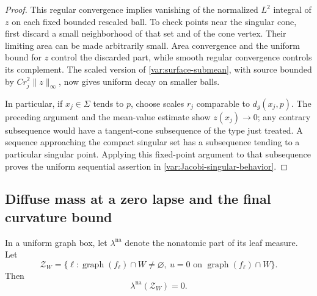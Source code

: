 \begin{proof}
This regular convergence implies vanishing of the normalized
$L^2$ integral of $z$ on each fixed bounded rescaled ball.
To check points near the singular cone, first discard a small
neighborhood of that set and of the cone vertex.  Their limiting
area can be made arbitrarily small.  Area convergence and the
uniform bound for $z$ control the discarded part, while smooth
regular convergence controls its complement.  The scaled
version of \eqref{var:surface-submean}, with source bounded by
$Cr_j^2\|z\|_\infty$, now gives uniform decay on smaller balls.

In particular, if $x_j\in\Sigma$ tends to $p$, choose scales
$r_j$ comparable to $d_g(x_j,p)$.  The preceding argument and
the mean-value estimate show $z(x_j)\to0$; any contrary
subsequence would have a tangent-cone subsequence of the type
just treated.  A sequence approaching the compact singular set
has a subsequence tending to a particular singular point.
Applying this fixed-point argument to that subsequence proves
the uniform sequential assertion in
\eqref{var:Jacobi-singular-behavior}.
\end{proof}

\subsection{Diffuse mass at a zero lapse and the final curvature bound}

\begin{lemma}
\label{var:diffuse-zero-mass}
In a uniform graph box, let $\lambda^{\mathrm{na}}$ denote the
nonatomic part of its leaf measure.  Let
\[
 \mathcal Z_W=\{\ell:
       \operatorname{graph}(f_\ell)\cap W\ne\varnothing,
       \ u=0\text{ on }\operatorname{graph}(f_\ell)\cap W\}.
\]
Then
\begin{equation}\label{var:diffuse-zero-claim}
 \lambda^{\mathrm{na}}(\mathcal Z_W)=0.
\end{equation}
\end{lemma}

